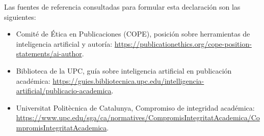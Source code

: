 Las fuentes de referencia consultadas para formular esta declaración son las
siguientes:

\begin{itemize}
  \item Comité de Ética en Publicaciones (COPE), posición sobre herramientas de inteligencia artificial y autoría:
  \url{https://publicationethics.org/cope-position-statements/ai-author}.
  \item Biblioteca de la UPC, guía sobre inteligencia artificial en publicación académica:
  \url{https://guies.bibliotecnica.upc.edu/intelligencia-artificial/publicacio-academica}.
  \item Universitat Politècnica de Catalunya, Compromiso de integridad académica:
  \url{https://www.upc.edu/sga/ca/normatives/CompromisIntegritatAcademica/CompromisIntegritatAcademica}.
\end{itemize}
